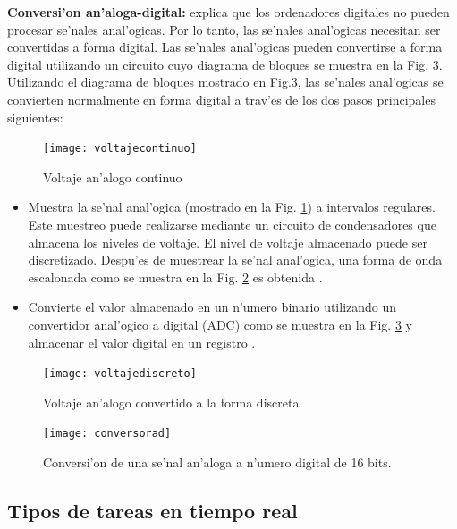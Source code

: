 \textbf{Conversi'on an'aloga-digital:} \citet{mall} explica que los ordenadores digitales no pueden procesar se'nales anal'ogicas. Por lo tanto, las se'nales anal'ogicas necesitan ser convertidas a forma digital. Las se'nales anal'ogicas pueden convertirse a forma digital utilizando un circuito cuyo diagrama de bloques se muestra en la Fig. \ref{fig:conversorad}. Utilizando el diagrama de bloques mostrado en Fig.\ref{fig:conversorad}, las se'nales anal'ogicas se convierten normalmente en forma digital a trav'es de los dos pasos principales siguientes:
\begin{figure}[ht]
	\centering
		\texttt{[image: voltajecontinuo]}
	\caption{Voltaje an'alogo continuo}
	\label{fig:voltajecontinuo}
\end{figure}


\begin{itemize}
	\item Muestra la se'nal anal'ogica (mostrado en la Fig. \ref{fig:voltajecontinuo}) a intervalos regulares. Este muestreo puede realizarse mediante un circuito de condensadores que almacena los niveles de voltaje. El nivel de voltaje almacenado puede ser discretizado. Despu'es de muestrear la se'nal anal'ogica, una forma de onda escalonada como se muestra en la Fig. \ref{fig:voltajedis} es obtenida \citep{mall}. 
\item Convierte el valor almacenado en un n'umero binario utilizando un convertidor anal'ogico a digital (ADC) como se muestra en la Fig. \ref{fig:conversorad} y almacenar el valor digital en un registro \citep{mall}. 

\end{itemize}

\begin{figure}[ht]
	\centering
		\texttt{[image: voltajediscreto]}
	\caption{Voltaje an'alogo convertido a la forma discreta}
	\label{fig:voltajedis}
\end{figure}

\begin{figure}[ht]
	\centering
		\texttt{[image: conversorad]}
	\caption{Conversi'on de una se'nal an'aloga a n'umero digital de 16 bits.}
	\label{fig:conversorad}
\end{figure}



\subsection{Tipos de tareas en tiempo real}

